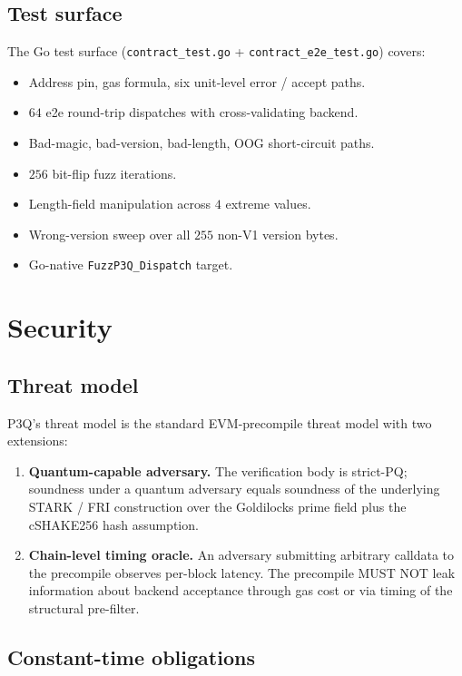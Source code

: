 \documentclass[11pt,a4paper]{article}
\begin{document}
\subsection{Test surface}

The Go test surface (\texttt{contract\_test.go} +
\texttt{contract\_e2e\_test.go}) covers:
\begin{itemize}
\item Address pin, gas formula, six unit-level error / accept paths.
\item $64$ e2e round-trip dispatches with cross-validating backend.
\item Bad-magic, bad-version, bad-length, OOG short-circuit paths.
\item $256$ bit-flip fuzz iterations.
\item Length-field manipulation across $4$ extreme values.
\item Wrong-version sweep over all $255$ non-V1 version bytes.
\item Go-native \texttt{FuzzP3Q\_Dispatch} target.
\end{itemize}

\section{Security}\label{sec:security}

\subsection{Threat model}

P3Q's threat model is the standard EVM-precompile threat model with
two extensions:
\begin{enumerate}
\item \textbf{Quantum-capable adversary.} The verification body is
strict-PQ; soundness under a quantum adversary equals soundness of
the underlying STARK / FRI construction over the Goldilocks
prime field plus the cSHAKE256 hash assumption.
\item \textbf{Chain-level timing oracle.} An adversary submitting
arbitrary calldata to the precompile observes per-block latency. The
precompile MUST NOT leak information about backend acceptance through
gas cost or via timing of the structural pre-filter.
\end{enumerate}

\subsection{Constant-time obligations}
\end{document}
